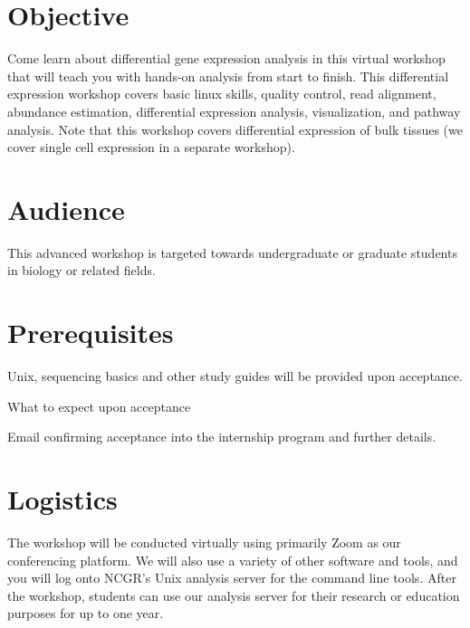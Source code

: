 \documentclass[
]{book}
\begin{document}
\hypertarget{objective-3}{%
\section*{Objective}\label{objective-3}}

Come learn about differential gene expression analysis in this virtual workshop that will teach you with hands-on analysis from start to finish. This differential expression workshop covers basic linux skills, quality control, read alignment, abundance estimation, differential expression analysis, visualization, and pathway analysis. Note that this workshop covers differential expression of bulk tissues (we cover single cell expression in a separate workshop).

\hypertarget{audience-3}{%
\section*{Audience}\label{audience-3}}

This advanced workshop is targeted towards undergraduate or graduate students in biology or related fields.

\hypertarget{prerequisites-3}{%
\section*{Prerequisites}\label{prerequisites-3}}

Unix, sequencing basics and other study guides will be provided upon acceptance.

What to expect upon acceptance

Email confirming acceptance into the internship program and further details.

\hypertarget{logistics-3}{%
\section*{Logistics}\label{logistics-3}}

The workshop will be conducted virtually using primarily Zoom as our conferencing platform. We will also use a variety of other software and tools, and you will log onto NCGR's Unix analysis server for the command line tools. After the workshop, students can use our analysis server for their research or education purposes for up to one year.
\end{document}
